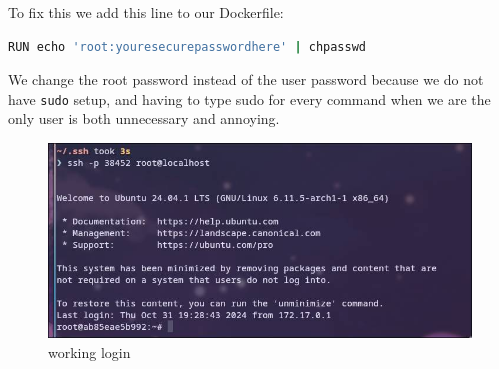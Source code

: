 \documentclass[a4paper]{article}
\begin{document}
To fix this we add this line to our Dockerfile:
\begin{lstlisting}[language=bash]
RUN echo 'root:youresecurepasswordhere' | chpasswd
\end{lstlisting}
We change the root password instead of the user password because we do not have \texttt{sudo} setup, and having to type sudo for every command when we are the only user is both unnecessary and annoying. 
\begin{figure}[h]
	\centering
	\includegraphics[scale=0.4]{images/workinglogin.png}
	\caption{working login}
\end{figure} \\
\newpage
\end{document}
